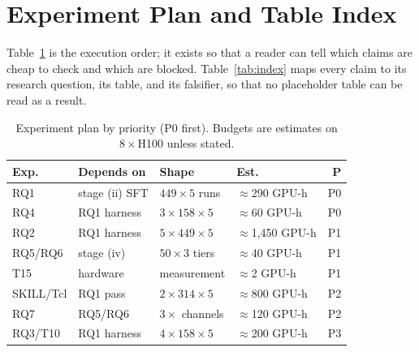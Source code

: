 ﻿\section{Experiment Plan and Table Index}\label{app:plan}

Table~\ref{tab:plan} is the execution order; it exists so that a reader can tell which claims are cheap to check and which are blocked.
Table~\ref{tab:index} maps every claim to its research question, its table, and its falsifier, so that no placeholder table can be read as a result.

\begin{table}[t]
\centering
\caption{Experiment plan by priority (P0 first). Budgets are estimates on $8{\times}$H100 unless stated.}
\label{tab:plan}
\scriptsize
\setlength{\tabcolsep}{2.6pt}
\begin{tabular}{@{}llp{2.05cm}lr@{}}
\toprule
\textbf{Exp.} & \textbf{Depends on} & \textbf{Shape} & \textbf{Est.} & \textbf{P} \\
\midrule
RQ1 & stage (ii) SFT & $449{\times}5$ runs & $\approx$290 GPU-h & P0 \\
RQ4 & RQ1 harness & $3{\times}158{\times}5$ & $\approx$60 GPU-h & P0 \\
RQ2 & RQ1 harness & $5{\times}449{\times}5$ & $\approx$1{,}450 GPU-h & P1 \\
RQ5/RQ6 & stage (iv) & $50{\times}3$ tiers & $\approx$40 GPU-h & P1 \\
T15 & hardware & measurement & $\approx$2 GPU-h & P1 \\
SKILL/Tcl & RQ1 pass & $2{\times}314{\times}5$ & $\approx$800 GPU-h & P2 \\
RQ7 & RQ5/RQ6 & $3{\times}$ channels & $\approx$120 GPU-h & P2 \\
RQ3/T10 & RQ1 harness & $4{\times}158{\times}5$ & $\approx$200 GPU-h & P3 \\
\bottomrule
\end{tabular}
\end{table}

